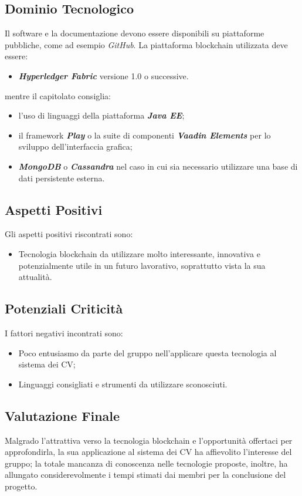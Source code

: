\subsection{Dominio Tecnologico}
  Il software e la documentazione devono essere disponibili su piattaforme pubbliche, come ad esempio \textit{GitHub}{}.
  \newline \newline La piattaforma blockchain utilizzata deve essere:
    \begin{itemize}
      \item \textit{\textbf{Hyperledger Fabric}} versione 1.0 o successive.
    \end{itemize}
 mentre il capitolato consiglia:
     \begin{itemize}
       \item l'uso di linguaggi della piattaforma \textit{\textbf{Java EE}};
       \item il framework \textit{\textbf{Play}} o la suite di componenti \textit{\textbf{Vaadin Elements}} per lo sviluppo dell'interfaccia grafica;
       \item \textit{\textbf{MongoDB}} o \textit{\textbf{Cassandra}} nel caso in cui sia necessario utilizzare una base di dati persistente esterna.
     \end{itemize}
  
\subsection{Aspetti Positivi}
  Gli aspetti positivi riscontrati sono:
  \begin{itemize}
    \item Tecnologia blockchain da utilizzare molto interessante, innovativa e potenzialmente utile in un futuro lavorativo,
    soprattutto vista la sua attualità.
  \end{itemize}

\subsection{Potenziali Criticità}
  I fattori negativi incontrati sono:
  \begin{itemize}
    \item Poco entusiasmo da parte del gruppo nell'applicare questa tecnologia al sistema dei CV;
    \item Linguaggi consigliati e strumenti da utilizzare sconosciuti.
  \end{itemize}
\subsection{Valutazione Finale}
  Malgrado l'attrattiva verso la tecnologia blockchain e l'opportunità offertaci per approfondirla, la sua applicazione al sistema dei CV ha affievolito l'interesse del gruppo; la totale mancanza di conoscenza nelle tecnologie proposte, inoltre, ha allungato considerevolmente i tempi stimati dai membri per la conclusione del progetto.
